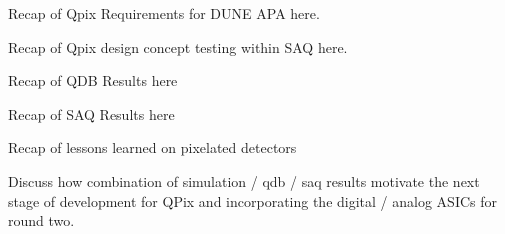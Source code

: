 Recap of Qpix Requirements for DUNE APA here.

Recap of Qpix design concept testing within SAQ here.

Recap of QDB Results here

Recap of SAQ Results here

Recap of lessons learned on pixelated detectors

Discuss how combination of simulation / qdb / saq results motivate the next stage of development for QPix and incorporating the digital / analog ASICs for round two.